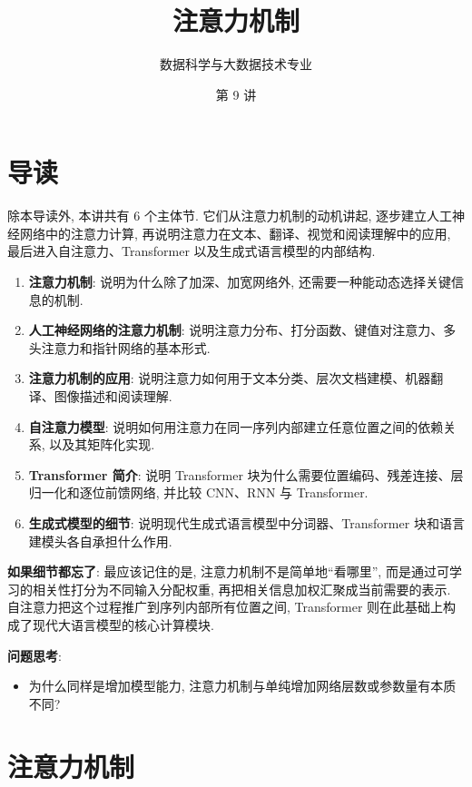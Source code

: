\documentclass{../nndlcourse}
\begin{document}
\title{注意力机制}
\author{数据科学与大数据技术专业}
\date{第 9 讲}
\maketitle

\section{导读}

除本导读外, 本讲共有 6 个主体节. 它们从注意力机制的动机讲起, 逐步建立人工神经网络中的注意力计算, 再说明注意力在文本、翻译、视觉和阅读理解中的应用, 最后进入自注意力、Transformer 以及生成式语言模型的内部结构.

\begin{enumerate}
  \item \textbf{注意力机制}: 说明为什么除了加深、加宽网络外, 还需要一种能动态选择关键信息的机制.
  \item \textbf{人工神经网络的注意力机制}: 说明注意力分布、打分函数、键值对注意力、多头注意力和指针网络的基本形式.
  \item \textbf{注意力机制的应用}: 说明注意力如何用于文本分类、层次文档建模、机器翻译、图像描述和阅读理解.
  \item \textbf{自注意力模型}: 说明如何用注意力在同一序列内部建立任意位置之间的依赖关系, 以及其矩阵化实现.
  \item \textbf{Transformer 简介}: 说明 Transformer 块为什么需要位置编码、残差连接、层归一化和逐位前馈网络, 并比较 CNN、RNN 与 Transformer.
  \item \textbf{生成式模型的细节}: 说明现代生成式语言模型中分词器、Transformer 块和语言建模头各自承担什么作用.
\end{enumerate}

\textbf{如果细节都忘了}: 最应该记住的是, 注意力机制不是简单地“看哪里”, 而是通过可学习的相关性打分为不同输入分配权重, 再把相关信息加权汇聚成当前需要的表示. 自注意力把这个过程推广到序列内部所有位置之间, Transformer 则在此基础上构成了现代大语言模型的核心计算模块.

\textbf{问题思考}:
\begin{itemize}
  \item 为什么同样是增加模型能力, 注意力机制与单纯增加网络层数或参数量有本质不同?
\end{itemize}

\section{注意力机制}
\end{document}
